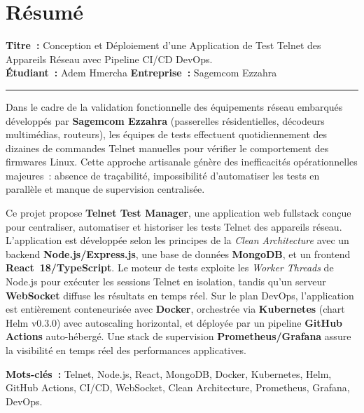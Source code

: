 
\chapter*{Résumé}

\noindent\textbf{Titre~:} Conception et Déploiement d'une Application de Test
Telnet des Appareils Réseau avec Pipeline CI/CD DevOps.\\[0.2cm]
\noindent\textbf{Étudiant~:} Adem Hmercha \hfill
\textbf{Entreprise~:} Sagemcom Ezzahra\\[0.3cm]
\noindent\rule{\textwidth}{0.4pt}
\vspace{0.3cm}

\noindent Dans le cadre de la validation fonctionnelle des équipements réseau
embarqués développés par \textbf{Sagemcom Ezzahra} (passerelles résidentielles,
décodeurs multimédias, routeurs), les équipes de tests effectuent quotidiennement
des dizaines de commandes Telnet manuelles pour vérifier le comportement des
firmwares Linux. Cette approche artisanale génère des inefficacités opérationnelles
majeures~: absence de traçabilité, impossibilité d'automatiser les tests en parallèle
et manque de supervision centralisée.

Ce projet propose \textbf{Telnet Test Manager}, une application web fullstack
conçue pour centraliser, automatiser et historiser les tests Telnet des appareils
réseau. L'application est développée selon les principes de la \textit{Clean
Architecture} avec un backend \textbf{Node.js/Express.js}, une base de données
\textbf{MongoDB}, et un frontend \textbf{React~18/TypeScript}. Le moteur de tests
exploite les \textit{Worker Threads} de Node.js pour exécuter les sessions Telnet
en isolation, tandis qu'un serveur \textbf{WebSocket} diffuse les résultats en
temps réel. Sur le plan DevOps, l'application est entièrement conteneurisée avec
\textbf{Docker}, orchestrée via \textbf{Kubernetes} (chart Helm v0.3.0) avec
autoscaling horizontal, et déployée par un pipeline \textbf{GitHub Actions}
auto-hébergé. Une stack de supervision \textbf{Prometheus/Grafana} assure la
visibilité en temps réel des performances applicatives.

\vspace{0.3cm}
\noindent\textbf{Mots-clés~:} Telnet, Node.js, React, MongoDB, Docker,
Kubernetes, Helm, GitHub Actions, CI/CD, WebSocket, Clean Architecture,
Prometheus, Grafana, DevOps.

